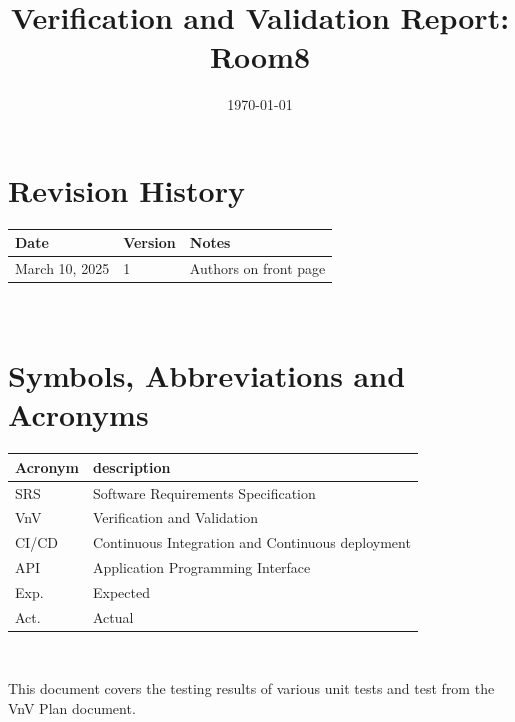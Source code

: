 \documentclass[12pt, titlepage]{article}
\begin{document}
\title{Verification and Validation Report: Room8} 
\author{\authname}
\date{\today}
	
\maketitle


\section{Revision History}

\begin{tabularx}{\textwidth}{p{3cm}p{2cm}X}
\toprule {\bf Date} & {\bf Version} & {\bf Notes}\\
\midrule
March 10, 2025 & 1 & Authors on front page\\
\bottomrule
\end{tabularx}

~\newpage

\section{Symbols, Abbreviations and Acronyms}

\renewcommand{\arraystretch}{1.2}
\begin{tabular}{l l} 
  \toprule		
  \textbf{Acronym} & \textbf{description}\\
  \midrule 
  SRS & Software Requirements Specification\\
  VnV & Verification and Validation\\
  CI/CD & Continuous Integration and Continuous deployment\\   
  API & Application Programming Interface\\
  Exp. & Expected\\
  Act. & Actual\\
  \bottomrule
\end{tabular}\\


\newpage

\tableofcontents

\listoftables %

\listoffigures %

\newpage


This document covers the testing results of various unit tests and test from the VnV Plan document.
\end{document}
